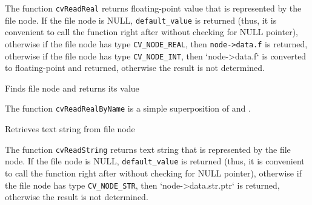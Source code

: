 The function \texttt{cvReadReal} returns floating-point value
that is represented by the file node. If the file node is NULL,
\texttt{default\_value} is returned (thus, it is convenient to call
the function right after  without checking for NULL
pointer), otherwise if the file node has type \texttt{CV\_NODE\_REAL},
then \texttt{node->data.f} is returned, otherwise if the file node has type
\texttt{CV\_NODE\_INT}, then `node->data.f` is converted to floating-point
and returned, otherwise the result is not determined.

\label{ReadRealByName}

Finds file node and returns its value


\begin{description}
\end{description}

The function \texttt{cvReadRealByName} is a simple superposition of  and .

\label{ReadString}

Retrieves text string from file node


\begin{description}
\end{description}

The function \texttt{cvReadString} returns text string that is represented
by the file node. If the file node is NULL, \texttt{default\_value}
is returned (thus, it is convenient to call the function right after
 without checking for NULL pointer), otherwise if
the file node has type \texttt{CV\_NODE\_STR}, then `node->data.str.ptr`
is returned, otherwise the result is not determined.

